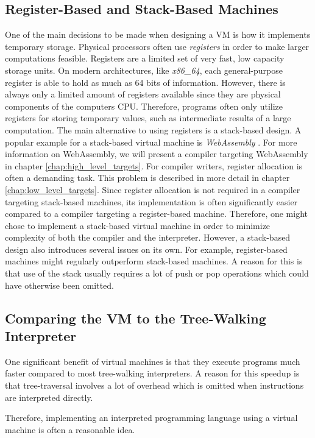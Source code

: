\subsection{Register-Based and Stack-Based Machines}

One of the main decisions to be made when designing a VM is how it implements temporary storage.
Physical processors often use \emph{registers} in order to make larger computations feasible.
Registers are a limited set of very fast, low capacity storage units.
On modern architectures, like \emph{x86\_64}, each general-purpose register is able to hold as much as 64 bits of information.
However, there is always only a limited amount of registers available since they are physical components of the computers CPU.
Therefore, programs often only utilize registers for storing temporary values, such as intermediate results of a large computation.
The main alternative to using registers is a stack-based design.
A popular example for a stack-based virtual machine is \emph{WebAssembly} \cite[p.~44]{Sendil2022-fy}.
For more information on WebAssembly, we will present a compiler targeting WebAssembly in chapter \ref{chap:high_level_targets}.
For compiler writers, register allocation is often a demanding task.
This problem is described in more detail in chapter \ref{chap:low_level_targets}.
Since register allocation is not required in a compiler targeting stack-based machines, its implementation is often significantly easier compared to a compiler targeting a register-based machine.
Therefore, one might chose to implement a stack-based virtual machine in order to minimize complexity of both the compiler and the interpreter.
However, a stack-based design also introduces several issues on its own.
For example, register-based machines might regularly outperform stack-based machines.
A reason for this is that use of the stack usually requires a lot of push or pop operations which could have otherwise been omitted.

\subsection{Comparing the VM to the Tree-Walking Interpreter}
One significant benefit of virtual machines is that they execute programs much faster compared to most tree-walking interpreters.
A reason for this speedup is that tree-traversal involves a lot of overhead which is omitted when instructions are interpreted directly.

Therefore, implementing an interpreted programming language using a virtual machine is often a reasonable idea.

